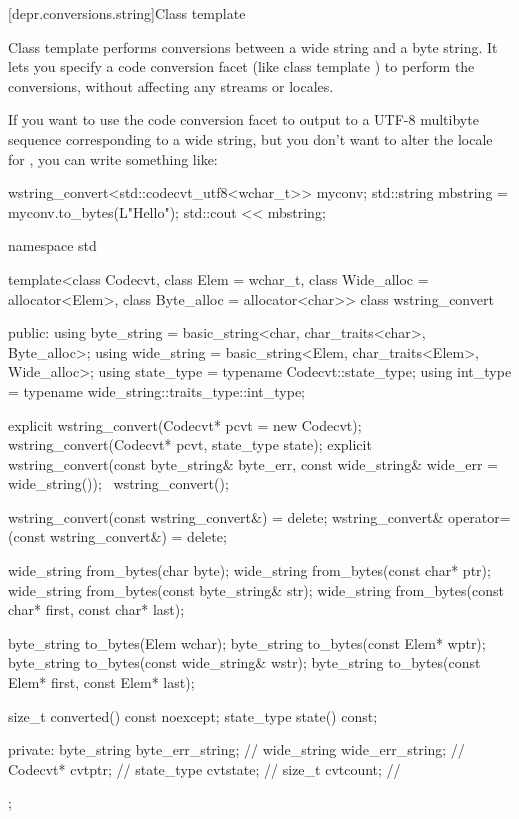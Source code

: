 [depr.conversions.string]{Class template }

\pnum
Class template  performs conversions between a wide
string and a byte string. It lets you specify a code conversion facet
(like class template ) to perform the conversions, without
affecting any streams or locales. \begin{example} If you want to use the code
conversion facet  to output to  a UTF-8
multibyte sequence corresponding to a wide string, but you don't want to
alter the locale for , you can write something like:
\begin{codeblock}
wstring_convert<std::codecvt_utf8<wchar_t>> myconv;
std::string mbstring = myconv.to_bytes(L"Hello\n");
std::cout << mbstring;
\end{codeblock}
\end{example}

%
\begin{codeblock}
namespace std {
  template<class Codecvt, class Elem = wchar_t,
           class Wide_alloc = allocator<Elem>,
           class Byte_alloc = allocator<char>>
    class wstring_convert {
    public:
      using byte_string = basic_string<char, char_traits<char>, Byte_alloc>;
      using wide_string = basic_string<Elem, char_traits<Elem>, Wide_alloc>;
      using state_type  = typename Codecvt::state_type;
      using int_type    = typename wide_string::traits_type::int_type;

      explicit wstring_convert(Codecvt* pcvt = new Codecvt);
      wstring_convert(Codecvt* pcvt, state_type state);
      explicit wstring_convert(const byte_string& byte_err,
                               const wide_string& wide_err = wide_string());
      ~wstring_convert();

      wstring_convert(const wstring_convert&) = delete;
      wstring_convert& operator=(const wstring_convert&) = delete;

      wide_string from_bytes(char byte);
      wide_string from_bytes(const char* ptr);
      wide_string from_bytes(const byte_string& str);
      wide_string from_bytes(const char* first, const char* last);

      byte_string to_bytes(Elem wchar);
      byte_string to_bytes(const Elem* wptr);
      byte_string to_bytes(const wide_string& wstr);
      byte_string to_bytes(const Elem* first, const Elem* last);

      size_t converted() const noexcept;
      state_type state() const;

    private:
      byte_string byte_err_string;  // \expos
      wide_string wide_err_string;  // \expos
      Codecvt* cvtptr;              // \expos
      state_type cvtstate;          // \expos
      size_t cvtcount;              // \expos
    };
}
\end{codeblock}

